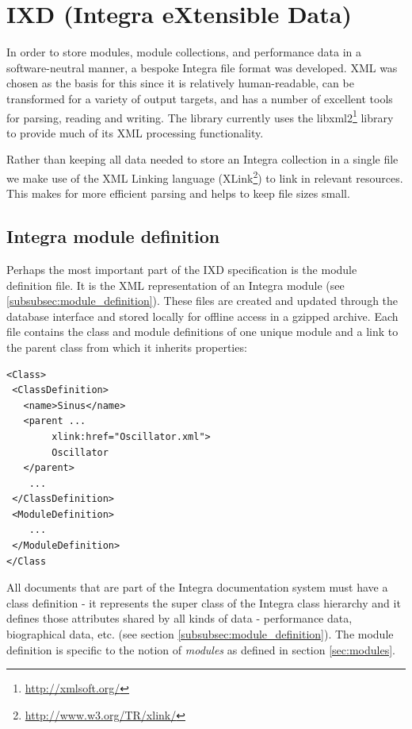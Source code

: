 \documentclass[10pt,journal,final]{IEEEtran}
\begin{document}
\section{IXD (Integra eXtensible Data)}\label{sec:ixd}

In order to store modules, module collections, and performance data in a software-neutral manner, a bespoke Integra file format was developed. XML was chosen as the basis for this since it is relatively human-readable, can be transformed for a variety of output targets, and has a number of excellent tools for parsing, reading and writing. The library currently uses the libxml2\footnote{\url{http://xmlsoft.org/}} library to provide much of its XML processing functionality.

Rather than keeping all data needed to store an Integra collection in a single file we make use of the XML Linking language (XLink\footnote{\url{http://www.w3.org/TR/xlink/}}) to link in relevant resources. This makes for more efficient parsing and helps to keep file sizes small.

\subsection{Integra module definition}\label{subsect:integra_class_definition}

Perhaps the most important part of the IXD specification is the module definition file. It is the XML representation of an Integra module (see \ref{subsubsec:module_definition}). These files are created and updated through the database interface and stored locally for offline access in a gzipped archive. Each file contains the class and module definitions of one unique module and a link to the parent class from which it inherits properties:

{\small
\begin{verbatim}
<Class>
 <ClassDefinition>
   <name>Sinus</name>
   <parent ...
        xlink:href="Oscillator.xml">
        Oscillator
   </parent>
    ...
 </ClassDefinition>
 <ModuleDefinition>
    ...
 </ModuleDefinition>
</Class
\end{verbatim}
}
All documents that are part of the Integra documentation system must have a class definition - it represents the super class of the Integra class hierarchy and it defines those attributes shared by all kinds of data - performance data, biographical data, etc. (see section \ref{subsubsec:module_definition}). The module definition is specific to the notion of \emph{modules} as defined in section \ref{sec:modules}.
\end{document}
